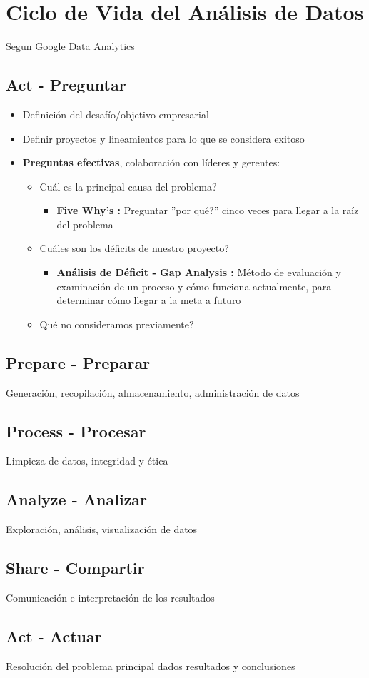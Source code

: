 \section{Ciclo de Vida del Análisis de Datos}
Segun Google Data Analytics

\subsection{Act - Preguntar}

\begin{itemize}
    \item {Definición del desafío/objetivo empresarial}
    \item {Definir proyectos y lineamientos para lo que se considera exitoso}
    \item {\textbf{Preguntas efectivas}, colaboración con líderes y gerentes:
    \begin{itemize}
        \item {Cuál es la principal causa del problema?}
        \begin{itemize}
            \item {\textbf{Five Why's : }Preguntar ''por qué?'' cinco veces para llegar a la raíz del problema}
        \end{itemize}
        \item {Cuáles son los déficits de nuestro proyecto?}
        \begin{itemize}
            \item {\textbf{Análisis de Déficit - Gap Analysis : }Método de evaluación y examinación de un proceso y cómo funciona actualmente, para determinar cómo llegar a la meta a futuro}
        \end{itemize}
        \item {Qué no consideramos previamente?}
    \end{itemize}}
\end{itemize}

\subsection{Prepare - Preparar}
Generación, recopilación, almacenamiento, administración de datos

\subsection{Process - Procesar}
Limpieza de datos, integridad y ética

\subsection{Analyze - Analizar}
Exploración, análisis, visualización de datos

\subsection{Share - Compartir}
Comunicación e interpretación de los resultados

\subsection{Act - Actuar}
Resolución del problema principal dados resultados y conclusiones